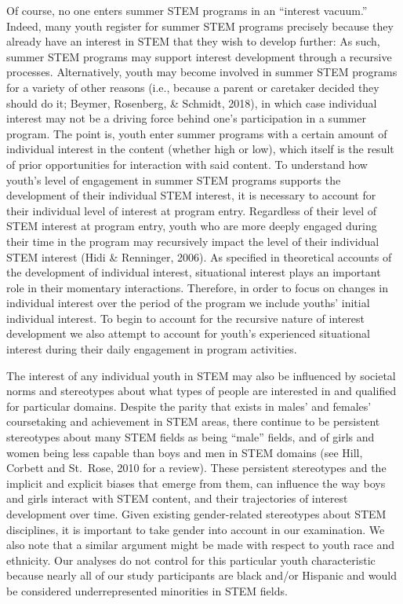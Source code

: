 \documentclass[man]{apa6}
\theoremstyle{definition}
\theoremstyle{definition}
\theoremstyle{definition}
\theoremstyle{remark}
\begin{document}
Of course, no one enters summer STEM programs in an \enquote{interest
vacuum.} Indeed, many youth register for summer STEM programs precisely
because they already have an interest in STEM that they wish to develop
further: As such, summer STEM programs may support interest development
through a recursive processes. Alternatively, youth may become involved
in summer STEM programs for a variety of other reasons (i.e., because a
parent or caretaker decided they should do it; Beymer, Rosenberg, \&
Schmidt, 2018), in which case individual interest may not be a driving
force behind one's participation in a summer program. The point is,
youth enter summer programs with a certain amount of individual interest
in the content (whether high or low), which itself is the result of
prior opportunities for interaction with said content. To understand how
youth's level of engagement in summer STEM programs supports the
development of their individual STEM interest, it is necessary to
account for their individual level of interest at program entry.
Regardless of their level of STEM interest at program entry, youth who
are more deeply engaged during their time in the program may recursively
impact the level of their individual STEM interest (Hidi \& Renninger,
2006). As specified in theoretical accounts of the development of
individual interest, situational interest plays an important role in
their momentary interactions. Therefore, in order to focus on changes in
individual interest over the period of the program we include youths'
initial individual interest. To begin to account for the recursive
nature of interest development we also attempt to account for youth's
experienced situational interest during their daily engagement in
program activities.

The interest of any individual youth in STEM may also be influenced by
societal norms and stereotypes about what types of people are interested
in and qualified for particular domains. Despite the parity that exists
in males' and females' coursetaking and achievement in STEM areas, there
continue to be persistent stereotypes about many STEM fields as being
\enquote{male} fields, and of girls and women being less capable than
boys and men in STEM domains (see Hill, Corbett and St.~Rose, 2010 for a
review). These persistent stereotypes and the implicit and explicit
biases that emerge from them, can influence the way boys and girls
interact with STEM content, and their trajectories of interest
development over time. Given existing gender-related stereotypes about
STEM disciplines, it is important to take gender into account in our
examination. We also note that a similar argument might be made with
respect to youth race and ethnicity. Our analyses do not control for
this particular youth characteristic because nearly all of our study
participants are black and/or Hispanic and would be considered
underrepresented minorities in STEM fields.
\end{document}
